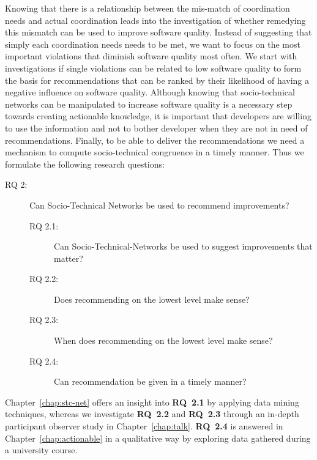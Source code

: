 Knowing that there is a relationship between the mis-match of coordination needs and actual coordination leads into the investigation of whether remedying this mismatch can be used to improve software quality.
Instead of suggesting that simply each coordination needs needs to be met, we want to focus on the most important violations that diminish software quality most often.
We start with investigations if single violations can be related to low software quality to form the basis for recommendations that can be ranked by their likelihood of having a negative influence on software quality.
Although knowing that socio-technical networks can be manipulated to increase software quality is a necessary step towards creating actionable knowledge, it is important that developers are willing to use the information and not to bother developer when they are not in need of recommendations.
Finally, to be able to deliver the recommendations we need a mechanism to compute socio-technical congruence in a timely manner.
Thus we formulate the following research questions:
\begin{description}
%
\item[RQ 2:] Can Socio-Technical Networks be used to recommend improvements? 
  \begin{description}
  \item[RQ 2.1:] Can Socio-Technical-Networks be used to suggest improvements that matter?
  \item[RQ 2.2:] Does recommending on the lowest level make sense?
  \item[RQ 2.3:] When does recommending on the lowest level make sense?
  \item[RQ 2.4:] Can recommendation be given in a timely manner?
  \end{description}
\end{description}
Chapter~\ref{chap:stc-net} offers an insight into \textbf{RQ~2.1} by applying data mining techniques, whereas we investigate \textbf{RQ~2.2} and \textbf{RQ~2.3} through an in-depth participant observer study in Chapter~\ref{chap:talk}.
\textbf{RQ~2.4} is answered in Chapter~\ref{chap:actionable} in a qualitative way by exploring data gathered during a university course.









